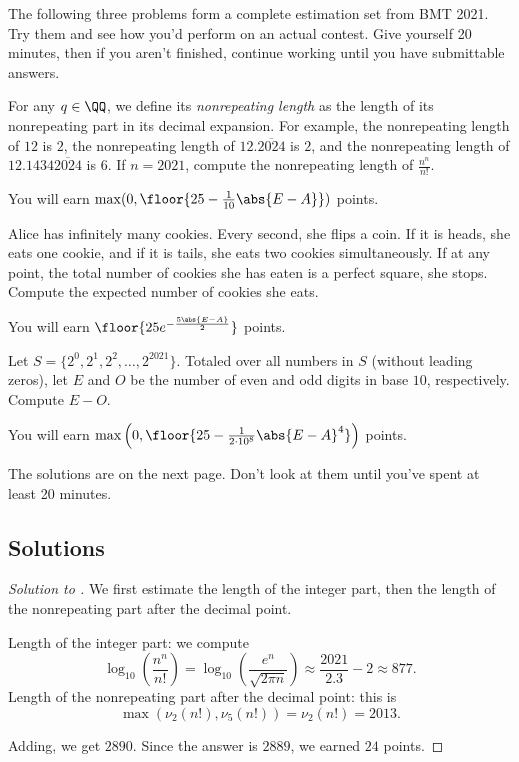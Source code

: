 \documentclass[11pt]{scrartcl}
\begin{document}
The following three problems form a complete estimation set from BMT 2021. Try them and see how you'd perform on an actual contest. Give yourself 20 minutes, then if you aren't finished, continue working until you have submittable answers.

\begin{problem}\label{pro:bmt_1}
	For any $q \in \QQ$, we define its \emph{nonrepeating length} as the length of its nonrepeating part in its decimal expansion. For example, the nonrepeating length of $12$ is $2$, the nonrepeating length of $12.\overline{2024}$ is $2$, and the nonrepeating length of $12.1434\overline{2024}$ is $6$. If $n = 2021$, compute the nonrepeating length of $\frac{n^n}{n!}$.

	You will earn $\max(0,\floor{25 - \frac1{10}\abs{E - A}})$ points.
\end{problem}

\begin{problem}\label{pro:bmt_2}
	Alice has infinitely many cookies. Every second, she flips a coin. If it is heads, she eats one cookie, and if it is tails, she eats two cookies simultaneously. If at any point, the total number of cookies she has eaten is a perfect square, she stops. Compute the expected number of cookies she eats.

	You will earn $\floor{25e^{-\frac{5\abs{E - A}}{2}}}$ points.
\end{problem}

\begin{problem}\label{pro:bmt_3}
	Let $S = \{2^0,2^1,2^2,\dots,2^{2021}\}$. Totaled over all numbers in $S$ (without leading zeros), let $E$ and $O$ be the number of even and odd digits in base $10$, respectively. Compute $E - O$.

	You will earn $\max\left(0,\floor{25 - \frac1{2 \cdot 10^8}\abs{E - A}^4}\right)$ points.
\end{problem}

The solutions are on the next page. Don't look at them until you've spent at least 20 minutes.

\pagebreak

\subsection{Solutions}

\begin{proof}[Solution to ]
    We first estimate the length of the integer part, then the length of the nonrepeating part after the decimal point.
    \begin{itemize}
        \ii Length of the integer part: we compute
        \[\log_{10}\left(\frac{n^n}{n!}\right) = \log_{10}\left(\frac{e^n}{\sqrt{2\pi n}}\right) \approx \frac{2021}{2.3} - 2 \approx 877.\]
        \ii Length of the nonrepeating part after the decimal point: this is
        \[\max(\nu_2(n!),\nu_5(n!)) = \nu_2(n!) = 2013.\]
    \end{itemize}
    Adding, we get $2890$. Since the answer is $2889$, we earned $24$ points.
\end{proof}
\end{document}
